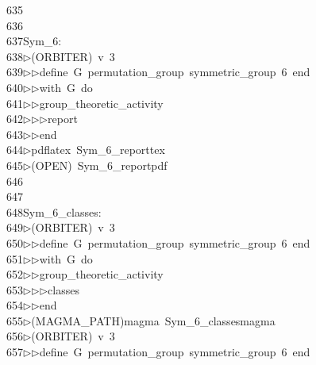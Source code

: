 \begin{tabbing}
635\>\\[0pt]
636\>\\[0pt]
637\>Sym\_6:\\[0pt]
638\>$\triangleright$\>(ORBITER)\ v\ 3\ \\[0pt]
639\>$\triangleright$\>$\triangleright$\>define\ G\ permutation\_group\ symmetric\_group\ 6\ end\ \\[0pt]
640\>$\triangleright$\>$\triangleright$\>with\ G\ do\ \\[0pt]
641\>$\triangleright$\>$\triangleright$\>group\_theoretic\_activity\ \\[0pt]
642\>$\triangleright$\>$\triangleright$\>$\triangleright$\>report\ \\[0pt]
643\>$\triangleright$\>$\triangleright$\>end\\[0pt]
644\>$\triangleright$\>pdflatex\ Sym\_6\_reporttex\\[0pt]
645\>$\triangleright$\>(OPEN)\ Sym\_6\_reportpdf\\[0pt]
646\>\\[0pt]
647\>\\[0pt]
648\>Sym\_6\_classes:\\[0pt]
649\>$\triangleright$\>(ORBITER)\ v\ 3\ \\[0pt]
650\>$\triangleright$\>$\triangleright$\>define\ G\ permutation\_group\ symmetric\_group\ 6\ end\ \\[0pt]
651\>$\triangleright$\>$\triangleright$\>with\ G\ do\ \\[0pt]
652\>$\triangleright$\>$\triangleright$\>group\_theoretic\_activity\ \\[0pt]
653\>$\triangleright$\>$\triangleright$\>$\triangleright$\>classes\ \\[0pt]
654\>$\triangleright$\>$\triangleright$\>end\\[0pt]
655\>$\triangleright$\>(MAGMA\_PATH)magma\ Sym\_6\_classesmagma\\[0pt]
656\>$\triangleright$\>(ORBITER)\ v\ 3\ \\[0pt]
657\>$\triangleright$\>$\triangleright$\>define\ G\ permutation\_group\ symmetric\_group\ 6\ end\ \\[0pt]

\end{tabbing}
